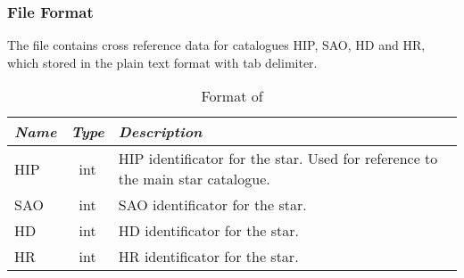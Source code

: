 \subsubsection{File Format}
\label{sec:StarCatalogues:CrossIdentificationData:file}

The file  contains cross reference data for catalogues HIP, SAO, HD and HR, which stored in the plain text format with tab delimiter.

\begin{table}[htb]
\begin{tabularx}{\textwidth}{l|c|X}\toprule
\emph{Name} & \emph{Type} & \emph{Description}\\\midrule
HIP	& int & HIP identificator for the star. Used for reference to the main star catalogue.\\%
SAO	& int & SAO identificator for the star.\\%
HD	& int & HD identificator for the star.\\%
HR	& int & HR identificator for the star.\\\bottomrule
\end{tabularx}
\caption{Format of }
\label{tab:StarCatalogues:CrossIdentificationData:file}
\end{table}

